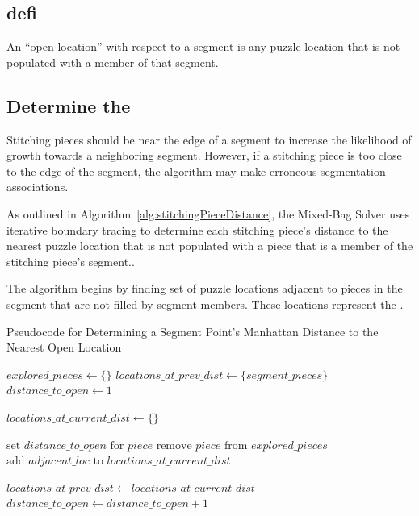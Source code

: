 \subsection{defi}



An ``open location'' with respect to a segment is any puzzle location that is not populated with a member of that segment.  

\subsection{Determine the }

Stitching pieces should be near the edge of a segment to increase the likelihood of growth towards a neighboring segment.  However,  if a stitching piece is too close to the edge of the segment, the algorithm may make erroneous segmentation associations.   

As outlined in Algorithm~\ref{alg:stitchingPieceDistance}, the Mixed-Bag Solver uses iterative boundary tracing to determine each stitching piece's distance to the nearest puzzle location that is not populated with a piece that is a member of the stitching piece's segment..

The algorithm begins by finding set of puzzle locations adjacent to pieces in the segment that are not filled by segment members.  These locations represent the .

\begin{algorithm}
\caption{Pseudocode for Determining a Segment Point's Manhattan Distance to the Nearest Open Location}\label{alg:findDistanceToOpen}
\begin{algorithmic}[1]
    \State $\textit{explored\_pieces} \gets \{ \}$
    \State $\textit{locations\_at\_prev\_dist} \gets \{ \textit{segment\_pieces} \}$
    \State $\textit{distance\_to\_open} \gets 1$
\item[]
        \State $\textit{locations\_at\_current\_dist} \gets \{ \}$
\item[]
        		
        			\State $\text{set } \textit{distance\_to\_open} \text{ for } \textit{piece}$
        			\State $\text{remove } \textit{piece} \text{ from } \textit{explored\_pieces}$
        			\State $\text{add } \textit{adjacent\_loc} \text{ to } \textit{locations\_at\_current\_dist}$
        		\EndIf
        	\EndFor
        \EndFor
\item[]
    \State $\textit{locations\_at\_prev\_dist} \gets locations\_at\_current\_dist$
    \State $\textit{distance\_to\_open} \gets \textit{distance\_to\_open} + 1$
    \EndWhile
\EndProcedure
\end{algorithmic}
\end{algorithm}

